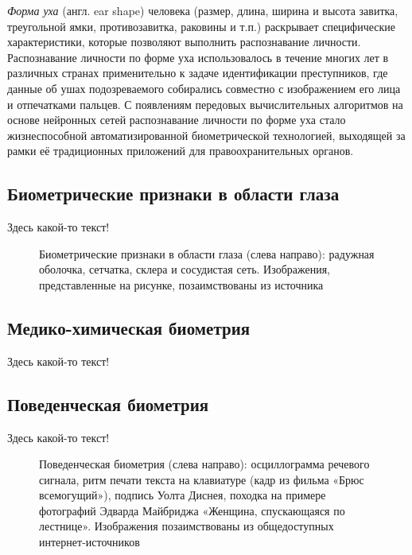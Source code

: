\documentclass[12pt]{book}
\begin{document}
\large{\textit{Форма уха} (англ. ear shape) человека (размер, длина, ширина и высота завитка, треугольной ямки, противозавитка, раковины и т.п.) раскрывает специфические характеристики, которые позволяют выполнить распознавание личности. Распознавание личности по форме уха использовалось в течение многих лет в различных странах применительно к задаче идентификации преступников, где данные об ушах подозреваемого собирались совместно с изображением его лица и отпечатками пальцев. С появлениям передовых вычислительных алгоритмов на основе нейронных сетей распознавание личности по форме уха стало жизнеспособной автоматизированной биометрической технологией, выходящей за рамки её традиционных приложений для правоохранительных органов.}

\subsection{Биометрические признаки в области глаза}

\large{Здесь какой-то текст!}

\begin{figure}[h]
\caption{Биометрические признаки в области глаза (слева направо): радужная оболочка, сетчатка, склера и сосудистая сеть. Изображения, представленные на рисунке, позаимствованы из источника \cite{unar_2014}}
\label{fig:figure_1_4}
\end{figure}

\subsection{Медико-химическая биометрия}

\large{Здесь какой-то текст!}

\subsection{Поведенческая биометрия}

\large{Здесь какой-то текст!}

\begin{figure}[h]
\caption{Поведенческая биометрия (слева направо): осциллограмма речевого сигнала, ритм печати текста на клавиатуре (кадр из фильма «Брюс всемогущий»), подпись Уолта Диснея, походка на примере фотографий Эдварда Майбриджа «Женщина, спускающаяся по лестнице». Изображения позаимствованы из общедоступных интернет-источников}
\label{fig:figure_1_5}
\end{figure}
\end{document}
